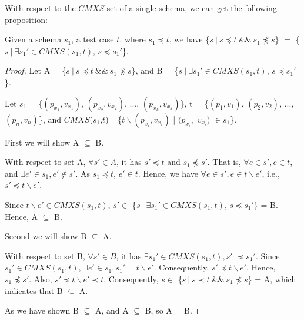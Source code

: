 With respect to the $CMXS$ set of a single schema, we can get the following proposition:


\begin{proposition}\label{pro:subofCMXS}
Given a schema $s_{1}$, a test case $t$, where $s_{1} \preceq t$, we have \{$s\ |\ s \preceq t\ \&\&\ s_{1} \npreceq s$\} $=$  \{$ s\ |\ \exists s_{1}' \in CMXS(s_{1}, t)$, $s \preceq s_{1}'$\}.
\end{proposition}

\begin{proof}

Let A =  \{$s\ |\ s \preceq t\ \&\&\ s_{1} \npreceq s$\}, and B = \{$ s\ |\ \exists s_{1}' \in CMXS(s_{1}, t)$, $s \preceq s_{1}'$\}.



Let $s_{1}$ = \{$(p_{x_{1}}, v_{x_{1}})$, $(p_{x_{2}}, v_{x_{2}})$, ..., $(p_{x_{k}}, v_{x_{k}})$\},  t = \{$(p_{1}, v_{1})$, $(p_{2}, v_{2})$, ..., $(p_{n}, v_{n})$\}, and $CMXS$($s_{1}$,$t$)= \{$t \backslash (p_{x_{i}}, v_{x_{i}})$ | $(p_{x_{i}},$ $v_{x_{i}})$ $ \in s_{1} $\}.

First we will show A $\subseteq$ B.

With respect to set A, $\forall s' \in A$, it has $s' \preceq t$ and $ s_{1} \npreceq s'$. That is, $\forall e \in s', e \in t$, and  $\exists e' \in s_{1}, e' \not\in s'$. As $s_{1} \preceq t$, $e' \in t$. Hence, we have $\forall e \in s', e \in t \backslash e'$, i.e., $s' \preceq t \backslash e'$.

Since $t \backslash e' \in CMXS(s_{1}, t)$,  $s' \in $ \{$ s\ |\ \exists s_{1}' \in CMXS(s_{1}, t)$, $s \preceq s_{1}'$\} = B. Hence, A $\subseteq$ B.

Second we will show B $\subseteq$ A.

With respect to set B, $\forall s' \in B$, it has $\exists s_{1}' \in CMXS(s_{1}, t), s'$ $ \preceq s_{1}'$. Since $s_{1}' \in CMXS(s_{1}, t)$, $\exists e' \in s_{1}, s_{1}' =  t \backslash e'$. Consequently, $s' \preceq t \backslash e'$. Hence, $s_{1} \npreceq s'$. Also, $s' \preceq t \backslash e' \prec t$. Consequently, $s \in $  \{$s\ |\ s \prec t\ \&\&\ s_{1} \npreceq s$\} = A, which indicates that B $\subseteq$ A.

As we have shown B $\subseteq$ A, and A $\subseteq$ B, so A = B.

\end{proof}


